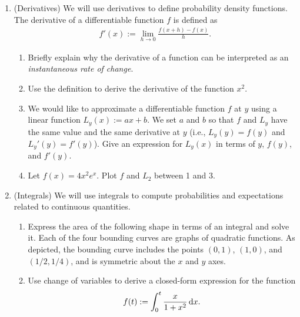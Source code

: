 \documentclass[12pt,twoside]{article}
\begin{document}
\begin{enumerate}
\item (Derivatives) We will use derivatives to define probability density functions. The derivative of a differentiable function $f$ is defined as 
\begin{align}
f'(x) := \lim_{h \rightarrow 0} \frac{f(x+h) - f(x)}{h}.
\end{align}
  \begin{enumerate}
  \item Briefly explain why the derivative of a function can be interpreted as an \emph{instantaneous rate of change}.
  \item Use the definition to derive the derivative of the function $x^2$.
  \item We would like to approximate a differentiable function $f$ at
    $y$ using a linear function $L_y(x):=ax + b$. We set $a$ and $b$
    so that $f$ and $L_y$ have the same value and the same derivative
    at $y$ (i.e., $L_y(y)=f(y)$ and $L_y'(y)=f'(y)$). Give an
    expression for $L_{y}(x)$ in terms of $y$, $f(y)$, and $f'(y)$.  
  \item Let $f(x) = 4x^2 e^{x}$. Plot $f$ and $L_{2}$ between 1 and 3. 
  \end{enumerate}
  
 \item (Integrals) We will use integrals to compute probabilities and expectations related to continuous quantities.
 \begin{enumerate}
 \item Express the area of the following shape in terms of an integral
   and solve it. Each of the four bounding curves are graphs of
   quadratic functions.  As depicted, the bounding curve includes the
   points $(0,1)$, $(1,0)$, and $(1/2,1/4)$, and is symmetric about
   the $x$ and $y$ axes.
 \begin{center}
\end{center}
  \item Use change of variables to derive a closed-form expression for the function
 \begin{align}
f(t) := \int_{0}^{t} \frac{x}{1+x^2} \, \text{d}x.
 \end{align}
\end{enumerate}


\end{enumerate}
\end{document}
